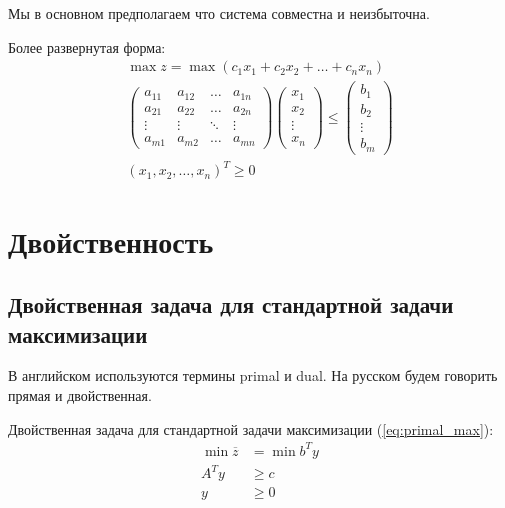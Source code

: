 \documentclass[a4paper,article,14pt]{extarticle}
\begin{document}
Мы в основном предполагаем что система совместна и неизбыточна.

Более развернутая форма:
\begin{equation}
    \begin{gathered}
        \max z = \max (c_1x_1 + c_2x_2 + \ldots + c_nx_n) \\
        \begin{pmatrix}
            a_{11} & a_{12} & \ldots & a_{1n} \\
            a_{21} & a_{22} & \ldots & a_{2n} \\
            \vdots & \vdots & \ddots & \vdots \\
            a_{m1} & a_{m2} & \ldots & a_{mn}
        \end{pmatrix}
        \begin{pmatrix}
            x_1 \\ x_2 \\ \vdots \\ x_n
        \end{pmatrix}
        \le
        \begin{pmatrix}
            b_1 \\ b_2 \\ \vdots \\ b_m
        \end{pmatrix}
        \\
        (x_1, x_2, \ldots, x_n)^T \ge 0
    \end{gathered}
\end{equation}

\newpage

\section{Двойственность}

\subsection{Двойственная задача для стандартной задачи максимизации}

В английском используются термины primal и dual.
На русском будем говорить прямая и двойственная.

Двойственная задача для стандартной задачи максимизации (\ref{eq:primal_max}):
\begin{equation} \label{dual_max}
    \begin{aligned}
        \min \overline z & = \min b^Ty \\
        A^Ty & \ge c \\
        y & \ge 0
    \end{aligned}
\end{equation}
\end{document}
